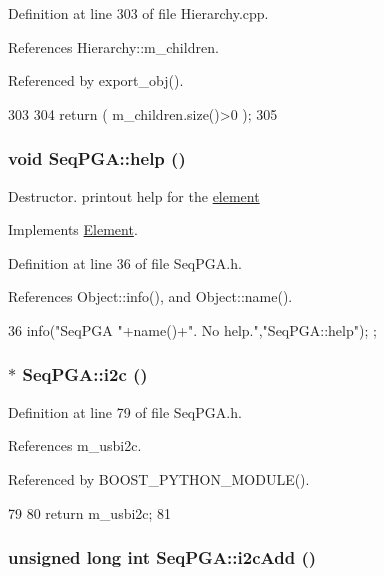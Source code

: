 Definition at line 303 of file Hierarchy.cpp.

References Hierarchy::m\_\-children.

Referenced by export\_\-obj().


\begin{DoxyCode}
303                               {
304   return ( m_children.size()>0 );
305 }
\end{DoxyCode}
\hypertarget{classSeqPGA_ae651bb2d5ac33e863951499c638655fe}{
\subsubsection[{help}]{\setlength{\rightskip}{0pt plus 5cm}void SeqPGA::help ()}}
\label{classSeqPGA_ae651bb2d5ac33e863951499c638655fe}


Destructor. printout help for the \hyperlink{namespaceelement}{element} 

Implements \hyperlink{classElement_a32c0de27acb08e17251cef88c3e9303a}{Element}.

Definition at line 36 of file SeqPGA.h.

References Object::info(), and Object::name().


\begin{DoxyCode}
36 { info("SeqPGA "+name()+". No help.","SeqPGA::help"); };
\end{DoxyCode}
\hypertarget{classSeqPGA_ad1629388bbd38b013110ee03a1eea339}{
\subsubsection[{i2c}]{$\ast$ SeqPGA::i2c ()}}
\label{classSeqPGA_ad1629388bbd38b013110ee03a1eea339}


Definition at line 79 of file SeqPGA.h.

References m\_\-usbi2c.

Referenced by BOOST\_\-PYTHON\_\-MODULE().


\begin{DoxyCode}
79                     {
80     return m_usbi2c;
81   }
\end{DoxyCode}
\hypertarget{classSeqPGA_a67022684977cb2f6335eb6b21262fe89}{
\subsubsection[{i2cAdd}]{\setlength{\rightskip}{0pt plus 5cm}unsigned long int SeqPGA::i2cAdd ()}}
\label{classSeqPGA_a67022684977cb2f6335eb6b21262fe89}


